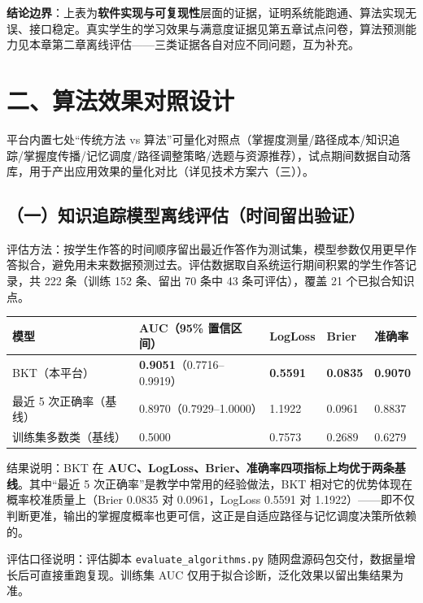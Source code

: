 \documentclass[zihao=-4,a4paper,UTF8,fontset=windows]{ctexart}
\begin{document}
\textbf{结论边界}：上表为\textbf{软件实现与可复现性}层面的证据，证明系统能跑通、算法实现无误、接口稳定。真实学生的学习效果与满意度证据见第五章试点问卷，算法预测能力见本章第二章离线评估——三类证据各自对应不同问题，互为补充。

\section{二、算法效果对照设计}

平台内置七处“传统方法 vs 算法”可量化对照点（掌握度测量/路径成本/知识追踪/掌握度传播/记忆调度/路径调整策略/选题与资源推荐），试点期间数据自动落库，用于产出应用效果的量化对比（详见技术方案六（三））。

\subsection{（一）知识追踪模型离线评估（时间留出验证）}

评估方法：按学生作答的时间顺序留出最近作答作为测试集，模型参数仅用更早作答拟合，避免用未来数据预测过去。评估数据取自系统运行期间积累的学生作答记录，共 222 条（训练 152 条、留出 70 条中 43 条可评估），覆盖 21 个已拟合知识点。

\par\noindent\begin{tabular}{|p{3.6cm}|p{4.6cm}|p{2.0cm}|p{2.0cm}|p{2.0cm}|}
\hline
\textbf{模型} & \textbf{AUC（95\% 置信区间）} & \textbf{LogLoss} & \textbf{Brier} & \textbf{准确率} \\ \hline
BKT（本平台） & \textbf{0.9051}（0.7716--0.9919） & \textbf{0.5591} & \textbf{0.0835} & \textbf{0.9070} \\ \hline
最近 5 次正确率（基线） & 0.8970（0.7929--1.0000） & 1.1922 & 0.0961 & 0.8837 \\ \hline
训练集多数类（基线） & 0.5000 & 0.7573 & 0.2689 & 0.6279 \\ \hline
\end{tabular}\par

结果说明：BKT 在 \textbf{AUC、LogLoss、Brier、准确率四项指标上均优于两条基线}。其中“最近 5 次正确率”是教学中常用的经验做法，BKT 相对它的优势体现在概率校准质量上（Brier 0.0835 对 0.0961，LogLoss 0.5591 对 1.1922）——即不仅判断更准，输出的掌握度概率也更可信，这正是自适应路径与记忆调度决策所依赖的。

评估口径说明：评估脚本 \texttt{evaluate\_\allowbreak{}algorithms.\allowbreak{}py} 随网盘源码包交付，数据量增长后可直接重跑复现。训练集 AUC 仅用于拟合诊断，泛化效果以留出集结果为准。
\end{document}
